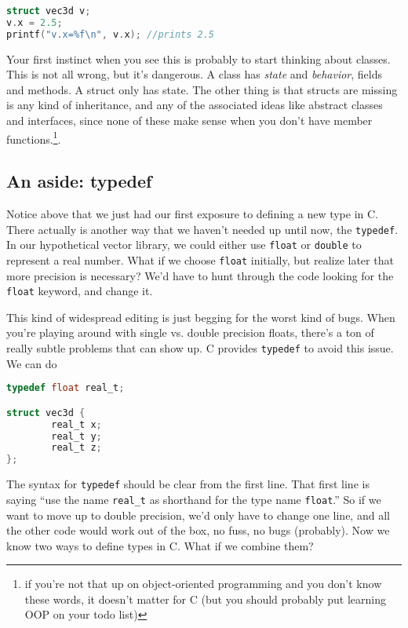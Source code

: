 \documentclass[ebook,11pt,oneside,openany]{memoir}
\newcommand{\cf}[1]{\texttt{#1}}
\begin{document}
\begin{lstlisting}[language=C]
struct vec3d v;
v.x = 2.5;
printf("v.x=%f\n", v.x); //prints 2.5
\end{lstlisting}

Your first instinct when you see this is probably to start thinking about classes. This is not all wrong, but it's dangerous. A class has \textit{state} and \textit{behavior}, fields and methods. A struct only has state. The other thing is that structs are missing is any kind of inheritance, and any of the associated ideas like abstract classes and interfaces, since none of these make sense when you don't have member functions.\footnote{if you're not that up on object-oriented programming and you don't know these words, it doesn't matter for C (but you should probably put learning OOP on your todo list)}.

\subsection{An aside: typedef}

Notice above that we just had our first exposure to defining a new type in C. There actually is another way that we haven't needed up until now, the \texttt{typedef}. In our hypothetical vector library, we could either use \texttt{float} or \texttt{double} to represent a real number. What if we choose \texttt{float} initially, but realize later that more precision is necessary? We'd have to hunt through the code looking for the \texttt{float} keyword, and change it. 


\noindent
This kind of widespread editing is just begging for the worst kind of bugs. When you're playing around with single vs. double precision floats, there's a ton of really subtle problems that can show up. C provides \texttt{typedef} to avoid this issue. We can do 


\begin{lstlisting}[language=C]
typedef float real_t;

struct vec3d {
        real_t x;
        real_t y;
        real_t z;
};
\end{lstlisting}

The syntax for \cf{typedef} should be clear from the first line. That first line is saying ``use the name \cf{real\_t} as shorthand for the type name \cf{float}.'' So if we want to move up to double precision, we'd only have to change one line, and all the other code would work out of the box, no fuss, no bugs (probably). Now we know two ways to define types in C. What if we combine them?
\end{document}
